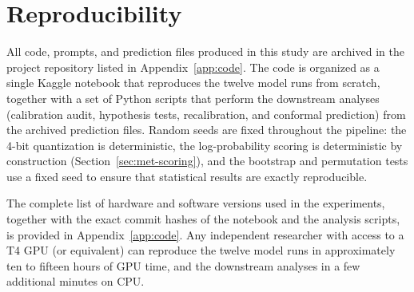 \section{Reproducibility}
\label{sec:met-reproducibility}

All code, prompts, and prediction files produced in this study are 
archived in the project repository listed in Appendix~\ref{app:code}. The 
code is organized as a single Kaggle notebook that reproduces the twelve 
model runs from scratch, together with a set of Python scripts that 
perform the downstream analyses (calibration audit, hypothesis tests, 
recalibration, and conformal prediction) from the archived prediction 
files. Random seeds are fixed throughout the pipeline: the 4-bit 
quantization is deterministic, the log-probability scoring is 
deterministic by construction (Section~\ref{sec:met-scoring}), and the 
bootstrap and permutation tests use a fixed seed to ensure that 
statistical results are exactly reproducible.

The complete list of hardware and software versions used in the 
experiments, together with the exact commit hashes of the notebook and 
the analysis scripts, is provided in Appendix~\ref{app:code}. Any 
independent researcher with access to a T4 GPU (or equivalent) can 
reproduce the twelve model runs in approximately ten to fifteen hours of 
GPU time, and the downstream analyses in a few additional minutes on 
CPU.